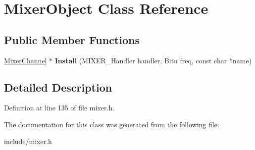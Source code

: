 \hypertarget{classMixerObject}{\section{Mixer\-Object Class Reference}
\label{classMixerObject}
}
\subsection*{Public Member Functions}
\begin{DoxyCompactItemize}
\item 
\hypertarget{classMixerObject_a910634e58ee1adb87a1efad24d75b87b}{\hyperlink{classMixerChannel}{Mixer\-Channel} $\ast$ {\bfseries Install} (M\-I\-X\-E\-R\-\_\-\-Handler handler, Bitu freq, const char $\ast$name)}\label{classMixerObject_a910634e58ee1adb87a1efad24d75b87b}

\end{DoxyCompactItemize}


\subsection{Detailed Description}


Definition at line 135 of file mixer.\-h.



The documentation for this class was generated from the following file\-:\begin{DoxyCompactItemize}
\item 
include/mixer.\-h\end{DoxyCompactItemize}
